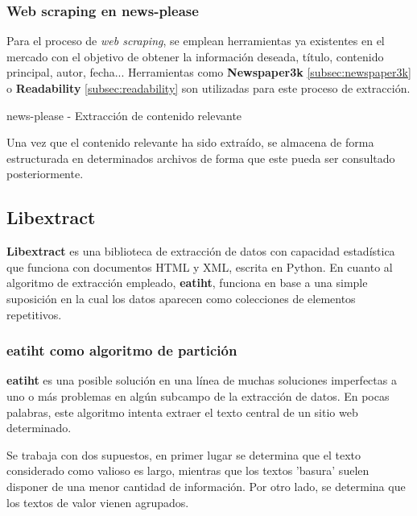 \subsubsection{Web scraping en news-please}
\label{subsubsec:web scraping en news-please}

Para el proceso de \emph{web scraping}, se emplean herramientas ya existentes en el mercado con el objetivo 
de obtener la información deseada, título, contenido principal, autor, fecha... Herramientas como 
\textbf{Newspaper3k} \ref{subsec:newspaper3k} o \textbf{Readability} \ref{subsec:readability} son utilizadas 
para este proceso de extracción.

\begin{codefloat}
  
  \caption{news-please - Extracción de contenido relevante}
  \label{cod:news-please - extraccion de contenido relevante}
\end{codefloat}

Una vez que el contenido relevante ha sido extraído, se almacena de forma estructurada en determinados
archivos de forma que este pueda ser consultado posteriormente.

\subsection{Libextract}
\label{subsec:libextract}

\textbf{Libextract} \cite{libextract} es una biblioteca de extracción de datos con capacidad estadística
que funciona con documentos HTML y XML, escrita en Python. En cuanto al algoritmo de extracción empleado,
\textbf{eatiht}, funciona en base a una simple suposición en la cual los datos aparecen como colecciones 
de elementos repetitivos.

\subsubsection{eatiht como algoritmo de partición}
\label{subsubsec:eatiht como algoritmo de particion}

\textbf{eatiht} \cite{eatiht} es una posible solución en una línea de muchas soluciones imperfectas a uno 
o más problemas en algún subcampo de la extracción de datos. En pocas palabras, este algoritmo intenta 
extraer el texto central de un sitio web determinado.

Se trabaja con dos supuestos, en primer lugar se determina que el texto considerado como valioso es largo, 
mientras que los textos 'basura' suelen disponer de una menor cantidad de información. Por otro lado, se 
determina que los textos de valor vienen agrupados.

